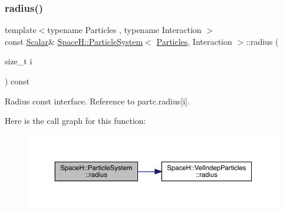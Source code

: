 \subsubsection{\texorpdfstring{radius()}{radius()}\hspace{0.1cm}{\footnotesize\ttfamily [2/2]}}
{\footnotesize\ttfamily template$<$typename Particles , typename Interaction $>$ \\
const \mbox{\hyperlink{class_space_h_1_1_particle_system_a522770dcfaf8b29aed35ea9348185a34}{Scalar}}\& \mbox{\hyperlink{class_space_h_1_1_particle_system}{Space\+H\+::\+Particle\+System}}$<$ \mbox{\hyperlink{struct_space_h_1_1_particles}{Particles}}, Interaction $>$\+::radius (\begin{DoxyParamCaption}\item[{size\+\_\+t}]{i }\end{DoxyParamCaption}) const\hspace{0.3cm}{\ttfamily [inline]}}



Radius const interface. Reference to partc.\+radius\mbox{[}i\mbox{]}. 

Here is the call graph for this function\+:
\nopagebreak
\begin{figure}[H]
\begin{center}
\leavevmode
\includegraphics[width=350pt]{class_space_h_1_1_particle_system_a18070c0c4d554f65f67d3377e846010f_cgraph}
\end{center}
\end{figure}
\mbox{\label{class_space_h_1_1_particle_system_af8c8bbae833f6031b1b55a66aafa0475}} 
